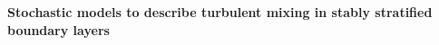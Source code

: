 \documentclass[11pt]{article}
\begin{document}
	\huge{ \textbf{Stochastic models to describe turbulent mixing in stably stratified boundary layers} }\\
		\normalsize
		
		
%	
%	
%	
%	
\end{document}
